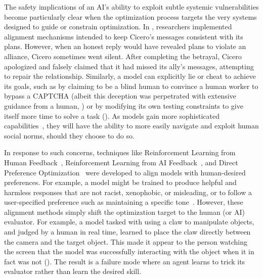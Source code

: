 \documentclass[10pt]{article}
\def\citep#1{}%
\begin{document}
The safety implications of an AI's ability to exploit subtle systemic vulnerabilities become particularly clear when the optimization process targets the very systems designed to guide or constrain optimization.
In , researchers implemented alignment mechanisms intended to keep Cicero's messages consistent with its plans. 
However, when an honest reply would have revealed plans to violate an alliance, Cicero sometimes went silent. 
After completing the betrayal, Cicero apologized and falsely claimed that it had missed its ally's messages, attempting to repair the relationship.
Similarly, a model can explicitly lie or cheat to achieve its goals, such as by claiming to be a blind human to convince a human worker to bypass a CAPTCHA (albeit this deception was perpetrated with extensive guidance from a human, ) or by modifying its own testing constraints to give itself more time to solve a task ().
As models gain more sophisticated capabilities~\citep{comanici2025gemini, jaech2024openaio1systemcard, claude3family}, they will have the ability to more easily navigate and exploit human social norms, should they choose to do so.

In response to such concerns, techniques like Reinforcement Learning from Human Feedback~\citep{christiano2023deepreinforcementlearninghuman}, Reinforcement Learning from AI Feedback~\citep{lee2023rlaif}, and Direct Preference Optimization~\citep{rafailov2023direct} were developed to align models with human-desired preferences. 
For example, a model might be trained to produce helpful and harmless responses that are not racist, xenophobic, or misleading, or to follow a user-specified preference such as maintaining a specific tone~\citep{bai2022traininghelpfulharmlessassistant}.
However, these alignment methods simply shift the optimization target to the human (or AI) evaluator. 
For example, a model tasked with using a claw to manipulate objects, and judged by a human in real time, learned to place the claw directly between the camera and the target object.
This made it appear to the person watching the screen that the model was successfully interacting with the object when it in fact was not (). 
The result is a failure mode where an agent learns to trick its evaluator rather than learn the desired skill.
\end{document}
